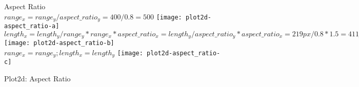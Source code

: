 \begin{figure}[H]\label{hc:plot2dAspectRatio}
  \begin{center}
    {\LARGE Aspect Ratio \\[2ex]}
    $range_x = range_y / aspect\_ratio_y = 400 / 0.8 = 500$
    \texttt{[image: plot2d-aspect\_ratio-a]}\\[2ex]
    $ length_x = length_y / range_y * range_x * aspect\_ratio_x = length_y / aspect\_ratio_y * aspect\_ratio_x = 219 px / 0.8 * 1.5 = 411 px$
    \texttt{[image: plot2d-aspect\_ratio-b]}\\[2ex]
    $range_x = range_y; length_x = length_y$
    \texttt{[image: plot2d-aspect\_ratio-c]}
  \end{center}
  \caption{Plot2d: Aspect Ratio}
\end{figure}
